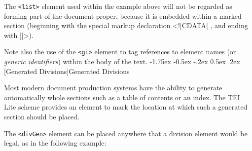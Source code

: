 \documentclass[11pt,twoside]{article}\makeatletter
\makeatletter
\renewcommand\section{\@startsection {section}{1}{\z@}%
     {-1.75ex \@plus -0.5ex \@minus -.2ex}%
     {0.5ex \@plus .2ex}%
     {\reset@font\Large\bfseries\sffamily}}
\renewcommand\subsection{\@startsection{subsection}{2}{\z@}%
     {-1.75ex\@plus -0.5ex \@minus- .2ex}%
     {0.5ex \@plus .2ex}%
     {\reset@font\Large\sffamily}}
\def\DivII{\subsection}
\def\DivII{\section}
\makeatother
\begin{document}
\par The \texttt{<list>} element used within the example above will not
be regarded as forming part of the document proper, because it is
embedded within a marked section (beginning with the special markup
declaration <![CDATA[ , and ending with
]]>).\par Note also the use of the \texttt{<gi>} element to tag references to
element names (or \emph{generic identifiers}) within the
body of the text.
\DivII[Generated Divisions]{Generated Divisions}\par Most modern document production systems have the ability to
generate automatically whole sections such as a table of contents or
an index. The TEI Lite scheme provides an element to mark the location
at which such a generated section should be placed.
\par The \texttt{<divGen>} element can be placed anywhere that a
division element would be legal, as in the following example:
\end{document}
